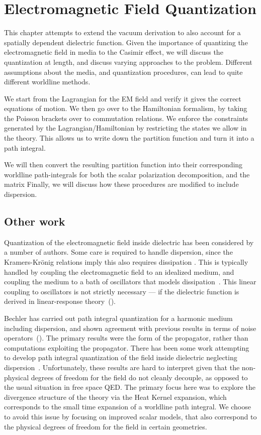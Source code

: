 \chapter{Electromagnetic Field Quantization}

\label{ch:EM_quantization}

This chapter attempts to extend the vacuum derivation to also account for a spatially dependent dielectric function.
Given the importance of quantizing the electromagnetic field in media to the Casimir effect,
we will discuss the quantization at length, and discuss varying approaches to the problem.  
Different assumptions about the media, and quantization procedures, can lead to quite different 
worldline methods.

  We start from the Lagrangian for the EM field and verify it gives the correct equations of motion.
  We then go over to the Hamiltonian formalism, by taking the Poisson brackets over to commutation relations.
  We enforce the constraints generated by the Lagrangian/Hamiltonian by restricting the states we allow in the theory.
  This allows us to write down the partition function and turn it into a path integral. 
  
  We will then convert the resulting partition function into their corresponding worldline path-integrals
  for both the scalar polarization decomposition, and the matrix 
  Finally, we will discuss how these procedures are modified to include dispersion.  

\section{Other work}
Quantization of the electromagnetic field inside dielectric has been considered
 by a number of authors.  
Some care is required to handle dispersion, since the Kramers-Kr\"onig relations
 imply this also requires dissipation .  
This is typically handled by coupling the electromagnetic field to an idealized
 medium, and coupling the medium to a bath of oscillators that models
 dissipation~\cite{Huttner1992,Dung1998}.  This linear coupling to oscillators is not 
strictly necessary --- if the dielectric function is derived in linear-response theory~(\cite{Rahi2009}).

Bechler has carried out path integral quantization for a harmonic medium 
including dispersion, and shown agreement with previous results in terms 
of noise operators~(\cite{Bechler1999}).  
The primary results were the form of the propagator, 
rather than computations exploiting the propagator.
  There has been some work attempting to develop path integral quantization of
 the field inside dielectric neglecting dispersion~\cite{Bordag1998}.
  Unfortunately, these results are hard to interpret given that the non-physical
 degrees of freedom for the field do not cleanly decouple, as opposed to the 
usual situation in free space QED.
  The primary focus here was to explore the divergence structure of the theory
 via the Heat Kernel expansion, which corresponds to the small time expansion
 of a worldline path integral.
  We choose to avoid this issue by focusing on improved scalar models, 
that also correspond to the physical degrees of freedom for the field in certain geometries.  



